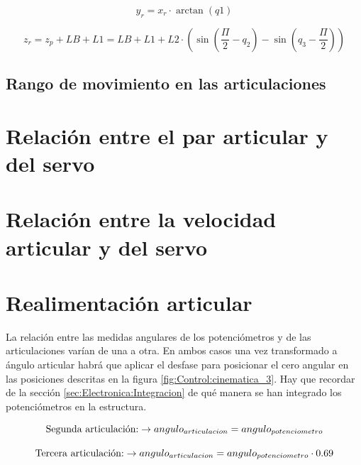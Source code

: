     \begin{equation}
        y_r = x_r \cdot \arctan{(q1)}
    \end{equation}

    \begin{equation}
        z_r = z_p+LB+L1 = LB + L1 + L2\cdot \left( \sin\left(\frac{\varPi}{2}-q_2\right) - \sin\left(q_3-\frac{\varPi}{2}\right) \right)
    \end{equation}

\subsection{Rango de movimiento en las articulaciones}


\section{Relación entre el par articular y del servo}
\section{Relación entre la velocidad articular y del servo}
	
\section{Realimentación articular}

	La relación entre las medidas angulares de los potenciómetros y de las articulaciones varían de una a otra. En ambos casos una vez transformado a ángulo articular habrá que aplicar el desfase para posicionar el cero angular en las posiciones descritas en la figura \ref{fig:Control:cinematica_3}. Hay que recordar de la sección \ref{sec:Electronica:Integracion} de qué manera se han integrado los potenciómetros en la estructura.
	
	   \begin{equation}
		   \textnormal{Segunda articulación:} \to	angulo_{articulacion} = angulo_{potenciometro} 
	   \end{equation}
	   
	   \begin{equation}
		   \textnormal{Tercera articulación:} \to	   angulo_{articulacion} = angulo_{potenciometro} \cdot 0.69
	   \end{equation}
